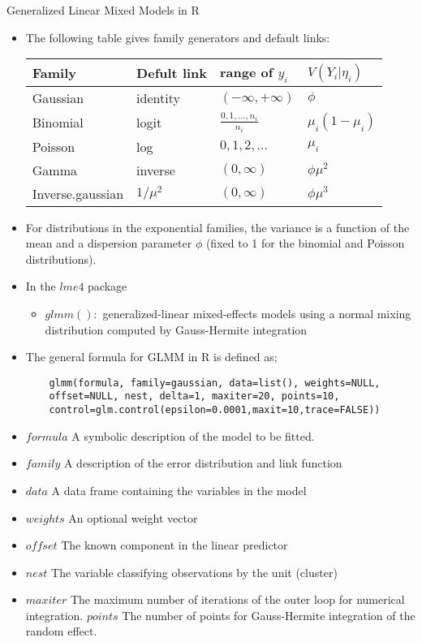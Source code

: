 \documentclass{beamer}
\begin{document}
\begin{frame}{Generalized Linear Mixed Models in R}
\begin{itemize}
	\item The following table gives family generators and default links:
	\begin{table}
		\begin{tabular}{|l|l|l|l|}
			\hline
		Family&Defult link&range of $y_i$ & $V(Y_i|\eta_i)$\\
			\hline
		Gaussian&identity&$(-\infty, +\infty)$ & $\phi$\\
		Binomial&logit&$\frac{0,1,\dots,n_i}{n_i}$& $\mu_i(1-\mu_i)$\\
		Poisson&log&$0,1,2,\dots$&$\mu_i$\\
		Gamma&inverse&$(0,\infty)$& $\phi\mu^2$\\
		Inverse.gaussian&$1/\mu^2$&$(0,\infty)$& $\phi\mu^3$\\
		\hline
		\end{tabular}
	\end{table}
\item For distributions in the exponential families, the variance is a function of the mean and a dispersion parameter $\phi$ (fixed to 1 for the binomial and Poisson distributions).
\item In the $lme4$ package
\begin{itemize}
	\item $glmm():$ generalized-linear mixed-effects models using a normal mixing distribution computed by Gauss-Hermite integration
\end{itemize}
\end{itemize}
\end{frame}

\begin{frame}[fragile]{}
\begin{itemize}
	\item The general formula for GLMM in R is defined as;
	\begin{verbatim}
	glmm(formula, family=gaussian, data=list(), weights=NULL,
	offset=NULL, nest, delta=1, maxiter=20, points=10, 
	control=glm.control(epsilon=0.0001,maxit=10,trace=FALSE))
	\end{verbatim}
\item $formula$	A symbolic description of the model to be fitted. 
\item $family$	A description of the error distribution and link function
\item $data$ A data frame containing the variables in the model
\item $weights$	An optional weight vector
\item $offset$ The known component in the linear predictor
\item $nest$ The variable classifying observations by the unit (cluster) 
\item $maxiter$	The maximum number of iterations of the outer loop for numerical integration.
$points$ The number of points for Gauss-Hermite integration of the random effect.
\end{itemize}
\end{frame}
\end{document}

